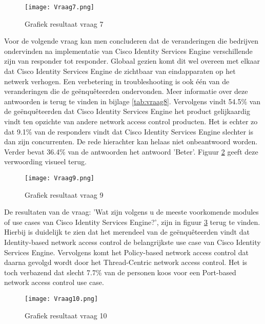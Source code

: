 \begin{figure}[H]
	\centering
	\texttt{[image: Vraag7.png]}
	\caption{Grafiek resultaat vraag 7}
	\label{fig:vraag7}
\end{figure}
\newpage
Voor de volgende vraag kan men concluderen dat de veranderingen die bedrijven ondervinden na implementatie van Cisco Identity Services Engine verschillende zijn van responder tot responder. Globaal gezien komt dit wel overeen met elkaar dat Cisco Identity Services Engine de zichtbaar van eindapparaten op het netwerk verhogen. Een verbetering in troubleshooting is ook één van de veranderingen die de geënquêteerden ondervonden. Meer informatie over deze antwoorden is terug te vinden in bijlage \ref{tab:vraag8}. Vervolgens vindt 54.5\% van de geënquêteerden dat Cisco Identity Services Engine het product gelijkaardig vindt ten opzichte van andere network access control producten. Het is echter zo dat 9.1\% van de responders vindt dat Cisco Identity Services Engine slechter is dan zijn concurrenten. De rede hierachter kan helaas niet onbeantwoord worden. Verder bevat 36.4\% van de antwoorden het antwoord 'Beter'. Figuur \ref{fig:vraag9} geeft deze verwoording visueel terug. 

\begin{figure}[H]
	\centering
	\texttt{[image: Vraag9.png]}
	\caption{Grafiek resultaat vraag 9}
	\label{fig:vraag9}
\end{figure}

De resultaten van de vraag: 'Wat zijn volgens u de meeste voorkomende modules of use cases van Cisco Identity Services Engine?', zijn in figuur \ref{fig:vraag10} terug te vinden. Hierbij is duidelijk te zien dat het merendeel van de geënquêteerden vindt dat Identity-based network access control de belangrijkste use case van Cisco Identity Services Engine. Vervolgens komt het Policy-based network access control dat daarna gevolgd wordt door het Thread-Centric network access control. Het is toch verbazend dat slecht 7.7\% van de personen koos voor een Port-based network access control use case. 

\begin{figure}[H]
	\centering
	\texttt{[image: Vraag10.png]}
	\caption{Grafiek resultaat vraag 10}
	\label{fig:vraag10}
\end{figure}


